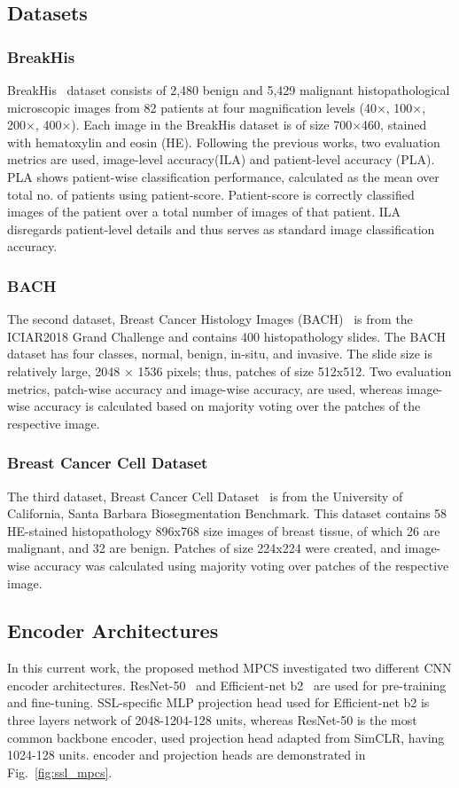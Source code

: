 \documentclass[conference]{IEEEtran}
\begin{document}
\subsection{Datasets}
\subsubsection{BreakHis}
BreakHis~\cite{spanhol2016dataset} dataset consists of 2,480 benign and 5,429 malignant histopathological microscopic images from 82 patients at four magnification levels (40×, 100×, 200×, 400×). Each image in the BreakHis dataset is of size 700×460, stained with hematoxylin and eosin (HE). Following the previous works, two evaluation metrics are used, image-level accuracy(ILA) and patient-level accuracy (PLA). PLA shows patient-wise classification performance, calculated as the mean over total no. of patients using patient-score. Patient-score is correctly classified images of the patient over a total number of images of that patient. ILA disregards patient-level details and thus serves as standard image classification accuracy.    
\subsubsection{BACH}
The second dataset, Breast Cancer Histology Images (BACH)~\cite{aresta2019bach} is from the ICIAR2018 Grand Challenge and contains 400 histopathology slides. The BACH dataset has four classes, normal, benign, in-situ, and invasive. The slide size is relatively large, 2048 × 1536 pixels; thus, patches of size 512x512. Two evaluation metrics, patch-wise accuracy and image-wise accuracy, are used, whereas image-wise accuracy is calculated based on majority voting over the patches of the respective image.
\subsubsection{Breast Cancer Cell Dataset}
The third dataset, Breast Cancer Cell Dataset~\cite{gelasca2008evaluation} is from the University of California, Santa Barbara Biosegmentation Benchmark. This dataset contains 58 HE-stained histopathology 896x768 size images of breast tissue, of which 26 are malignant, and 32 are benign. Patches of size 224x224 were created, and image-wise accuracy was calculated using majority voting over patches of the respective image. 
\subsection{Encoder Architectures}
In this current work, the proposed method MPCS investigated two different CNN encoder architectures. ResNet-50~\cite{yu2017dilated} and Efficient-net b2~\cite{tan2019efficientnet} are used for pre-training and fine-tuning. SSL-specific MLP projection head used for Efficient-net b2 is three layers network of 2048-1204-128 units, whereas ResNet-50 is the most common backbone encoder, used projection head adapted from SimCLR, having 1024-128 units. encoder and projection heads are demonstrated in Fig.~\ref{fig:ssl_mpcs}.
\end{document}
